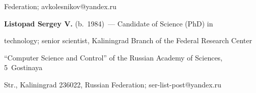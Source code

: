Federation; \mbox{avkolesnikov@yandex.ru} 


  


  \vspace*{3pt}


  


  \noindent


  \textbf{Listopad Sergey V.} (b.\ 1984)~--- Candidate of  Science (PhD) in 


technology; senior scientist, Kaliningrad Branch of the Federal Research Center 


``Computer Science and Control'' of the Russian Academy of Sciences, 5~Gostinaya 


Str., Kaliningrad 236022, Russian Federation; \mbox{ser-list-post@yandex.ru} 


\label{end\stat}








\renewcommand{\bibname}{\protect\rm Литература}    



